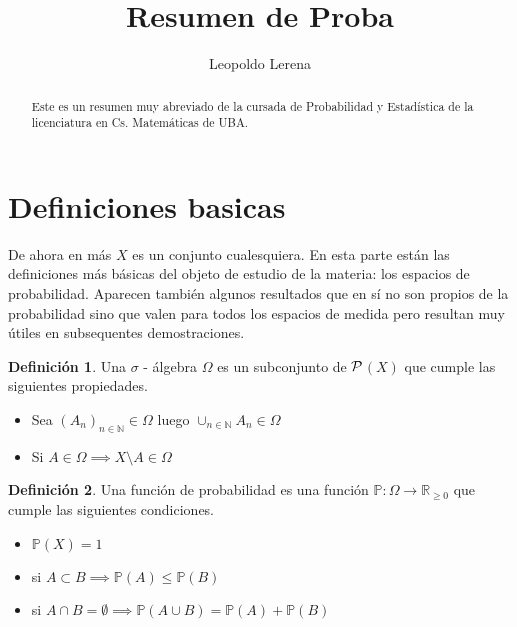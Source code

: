 \documentclass[11pt]{article}
\theoremstyle{plain} %
\theoremstyle{definition}
\newtheorem*{definicion}{Definici\'{o}n} %
\theoremstyle{remark}
\def\Om{\Omega}
\def\R{\mathbb{R}}
\def\N{\mathbb{N}}
\def\P{\mathbb{P}}
\def\blue{\textcolor{blue!60!black}}
\begin{document}
\title{\color{black!80!green}Resumen de Proba}
\author{\color{black!70!green}Leopoldo Lerena}
\date{}
\maketitle

\begin{abstract}
	Este es un resumen muy abreviado de la cursada de Probabilidad y Estad\'{i}stica de la licenciatura en Cs. Matem\'{a}ticas de UBA.
\end{abstract}


\tableofcontents


\eject



\bigskip 










\section{Definiciones basicas}
\label{sec:discretos}

De ahora en m\'as $X$ es un conjunto cualesquiera. En esta parte están las definiciones más básicas del objeto de estudio de la materia: los espacios de probabilidad. Aparecen también algunos resultados que en sí no son propios de la probabilidad sino que valen para todos los espacios de medida pero resultan muy útiles en subsequentes demostraciones.

\begin{definicion}
	Una \blue{$\sigma$ - \'algebra} $\Omega$ es un subconjunto de $\cal{P}$$(X)$ que cumple las siguientes propiedades.
	\begin{itemize}
		\item Sea $(A_n)_{n \in \N} \in \Omega$ luego $\cup_{n \in \N} A_{n} \in \Om$
		\item Si $A \in \Om \implies X\setminus A \in \Om$
	\end{itemize}
\end{definicion}

\begin{definicion}
	Una \blue{funci\'on de probabilidad}  es una funci\'on $\mathbb P: \Om \to \R_{\geq 0}$ que cumple las siguientes condiciones.
	\begin{itemize}
		\item  $\P(X) = 1$
		\item si $A \subset B \implies \P(A) \leq \P(B)$
		\item si $A \cap B = \emptyset \implies \P(A \cup B) = \P(A) + \P(B)$
	\end{itemize}
\end{definicion}
\end{document}
